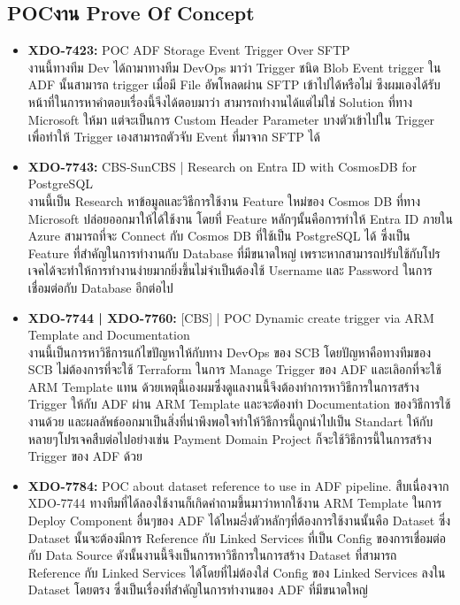 \subsection{\ifenglish POC\else งาน Prove Of Concept\fi}
\begin{itemize}
      \item \textbf{XDO-7423:} POC ADF Storage Event Trigger Over SFTP\\
            งานนี้ทางทีม Dev ได้ถามาทางทีม DevOps มาว่า Trigger ชนิด Blob Event trigger ใน ADF นั้นสามารถ trigger เมื่อมี File อัพโหลดผ่าน SFTP เข้าไปได้หรือไม่ ซึงผมเองได้รับหน้าที่ในการหาคำตอบเรื่องนี้จีงได้ตอบมาว่า สามารถทำงานได้แต่ไม่ใช่ Solution ที่ทาง Microsoft ให้มา แต่จะเป็นการ Custom Header Parameter บางตัวเข้าไปใน Trigger เพื่อทำให้ Trigger เองสามารถตัวจับ Event ที่มาจาก SFTP ได้
      \item \textbf{XDO-7743:} CBS-SunCBS | Research on Entra ID with CosmosDB for PostgreSQL\\
            งานนี้เป็น Research หาข้อมูลและวิธีการใช้งาน Feature ใหม่ของ Cosmos DB ที่ทาง Microsoft ปล่อยออกมาให้ได้ใช้งาน โดยที่ Feature หลักๆนั้นคือการทำให้ Entra ID ภายใน Azure สามารถที่จะ Connect กับ Cosmos DB ที่ใช้เป็น PostgreSQL ได้ ซึ่งเป็น Feature ที่สำคัญในการทำงานกับ Database ที่มีขนาดใหญ่ เพราะหากสามารถปรับใช้กับโปรเจคได้จะทำให้การทำงานง่ายมากยิ่งขึ้นไม่จำเป็นต้องใช้ Username และ Password ในการเชื่อมต่อกับ Database อีกต่อไป 
      \item \textbf{XDO-7744 | XDO-7760:} [CBS] | POC Dynamic create trigger via ARM Template and Documentation\\
            งานนี้เป็นการหาวิธีการแก้ไขปัญหาให้กับทาง DevOps ของ SCB โดยปัญหาคือทางทีมของ SCB ไม่ต้องการที่จะใช้ Terraform ในการ Manage Trigger ของ ADF และเลิอกที่จะใช้ ARM Template แทน ด้วยเหตุนี้เองผมซึ่งดูแลงานนี้จึงต้องทำการหาวิธีการในการสร้าง Trigger ให้กับ ADF ผ่าน ARM Template และจะต้องทำ Documentation ของวิธีการใช้งานด้วย และผลลัพธ์ออกมาเป็นสิ่งที่น่าพึงพอใจทำให้วิธีการนี้ถูกนำไปเป็น Standart ให้กับหลายๆโปรเจคสืบต่อไปอย่างเช่น Payment Domain Project ก็จะใช้วิธีการนี้ในการสร้าง Trigger ของ ADF ด้วย
      \item \textbf{XDO-7784:} POC about dataset reference to use in ADF pipeline.
            สืบเนื่องจาก XDO-7744 ทางทีมที่ได้ลองใช้งานก็เกิดคำถามขึ้นมาว่าหากใช้งาน ARM Template ในการ Deploy Component อื่นๆของ ADF ได้ไหม๘ึ่งตัวหลักๆที่ต้องการใช้งานนั้นคือ Dataset ซึ่ง Dataset นั้นจะต้องมีการ Reference กับ Linked Services ที่เป็น Config ของการเชื่อมต่อกับ Data Source ดังนั้นงานนี้จึงเป็นการหาวิธีการในการสร้าง Dataset ที่สามารถ Reference กับ Linked Services ได้โดยที่ไม่ต้องใส่ Config ของ Linked Services ลงใน Dataset โดยตรง ซึ่งเป็นเรื่องที่สำคัญในการทำงานของ ADF ที่มีขนาดใหญ่
\end{itemize}

